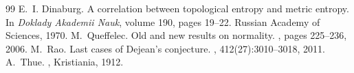 \documentclass[12pt]{article}
\theoremstyle{plain}\newtheorem{teo}{Theorem}
\theoremstyle{plain}\newtheorem{proposition}[teo]{Proposition}
\theoremstyle{plain}\newtheorem{lemma}[teo]{Lemma}
\theoremstyle{plain}\newtheorem{corollary}[teo]{Corollary}
\theoremstyle{plain}\newtheorem{conjecture}[teo]{Conjecture}
\theoremstyle{definition}\newtheorem{definition}[teo]{Definition}
\theoremstyle{remark}\newtheorem{remark}[teo]{Remark}
\theoremstyle{definition}\newtheorem{example}[teo]{Example}
\numberwithin{teo}{section}
\numberwithin{equation}{section}
\begin{document}
\begin{thebibliography}{99}
	E.~I. Dinaburg.
	\newblock A correlation between topological entropy and metric entropy.
	\newblock In {\em Doklady Akademii Nauk}, volume 190, pages 19--22. Russian
	Academy of Sciences, 1970.
%
%
%
%
%
%
%
	M.~Queffelec.
	\newblock Old and new results on normality.
	, pages 225--236, 2006.
%
	M.~Rao.
	\newblock Last cases of {{Dejean}}'s conjecture.
	, 412(27):3010--3018, 2011.
%
%
%
%
%
	A.~Thue.
	, {Kristiania}, 1912.
%

\end{thebibliography}
\end{document}

